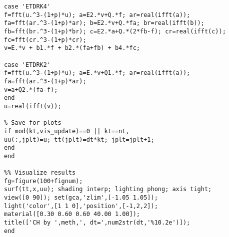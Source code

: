\begin{verbatim}
case 'ETDRK4'
f=fft(u.^3-(1+p)*u); a=E2.*v+Q.*f; ar=real(ifft(a));
fa=fft(ar.^3-(1+p)*ar); b=E2.*v+Q.*fa; br=real(ifft(b));
fb=fft(br.^3-(1+p)*br); c=E2.*a+Q.*(2*fb-f); cr=real(ifft(c));
fc=fft(cr.^3-(1+p)*cr);
v=E.*v + b1.*f + b2.*(fa+fb) + b4.*fc;

case 'ETDRK2'
f=fft(u.^3-(1+p)*u); a=E.*v+Q1.*f; ar=real(ifft(a));
fa=fft(ar.^3-(1+p)*ar); 
v=a+Q2.*(fa-f);
end
u=real(ifft(v));

% Save for plots
if mod(kt,vis_update)==0 || kt==nt,
uu(:,jplt)=u; tt(jplt)=dt*kt; jplt=jplt+1; 
end
end

%% Visualize results
fg=figure(100+fignum); 
surf(tt,x,uu); shading interp; lighting phong; axis tight;
view([0 90]); set(gca,'zlim',[-1.05 1.05]);
light('color',[1 1 0],'position',[-1,2,2]);
material([0.30 0.60 0.60 40.00 1.00]);
title(['CH by ',meth,', dt=',num2str(dt,'%10.2e')]);
end
\end{verbatim}
